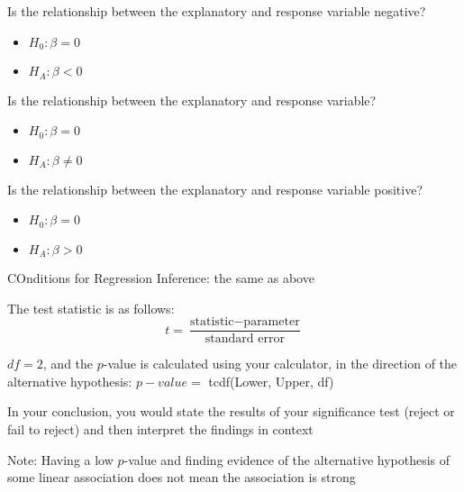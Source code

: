 \documentclass[../stats.tex]{subfiles}
\begin{document}
Is the relationship between the explanatory and response variable negative?
\begin{itemize}
    \item $H_0: \beta = 0$
    \item $H_A: \beta < 0$
\end{itemize}

Is the relationship between the explanatory and response variable?
\begin{itemize}
    \item $H_0: \beta = 0$
    \item $H_A: \beta \neq 0$
\end{itemize}

Is the relationship between the explanatory and response variable positive?
\begin{itemize}
    \item $H_0: \beta = 0$
    \item $H_A: \beta > 0$
\end{itemize}

COnditions for Regression Inference: the same as above 

The test statistic is as follows:
\[ t = \frac{\text{statistic}-\text{parameter}}{\text{standard error}} \]

$df=2$, and the $p$-value is calculated using your calculator, in the direction of the alternative hypothesis: $p-value = $ tcdf(Lower, Upper, df) 

In your conclusion, you would state the results of your significance test (reject or fail to reject) and then interpret the findings in context 

Note: Having a low $p$-value and finding evidence of the alternative hypothesis of some linear association does not mean the association is strong 
\end{document}

